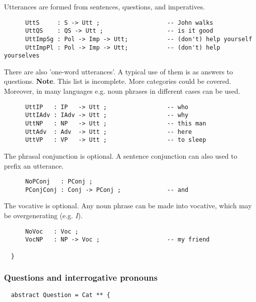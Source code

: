 \documentclass[11pt,a4paper]{article}
\newcommand{\commOut}[1]{}
\begin{document}
Utterances are formed from sentences, questions, and imperatives.

\begin{verbatim}
      UttS     : S -> Utt ;                   -- John walks
      UttQS    : QS -> Utt ;                  -- is it good
      UttImpSg : Pol -> Imp -> Utt;           -- (don't) help yourself
      UttImpPl : Pol -> Imp -> Utt;           -- (don't) help yourselves
\end{verbatim}

There are also 'one-word utterances'. A typical use of them is
as answers to questions.
\textbf{Note}. This list is incomplete. More categories could be covered.
Moreover, in many languages e.g. noun phrases in different cases
can be used.

\begin{verbatim}
      UttIP   : IP   -> Utt ;                 -- who
      UttIAdv : IAdv -> Utt ;                 -- why
      UttNP   : NP   -> Utt ;                 -- this man
      UttAdv  : Adv  -> Utt ;                 -- here
      UttVP   : VP   -> Utt ;                 -- to sleep
\end{verbatim}

The phrasal conjunction is optional. A sentence conjunction
can also used to prefix an utterance.

\begin{verbatim}
      NoPConj   : PConj ;                      
      PConjConj : Conj -> PConj ;             -- and
\end{verbatim}

The vocative is optional. Any noun phrase can be made into vocative,
which may be overgenerating (e.g. \textit{I}).

\begin{verbatim}
      NoVoc   : Voc ;
      VocNP   : NP -> Voc ;                   -- my friend
  
  }
\end{verbatim}

\commOut{Produced by 
gfdoc - a rudimentary GF document generator.
(c) Aarne Ranta (\htmladdnormallink{aarne@cs.chalmers.se}{mailto:aarne@cs.chalmers.se}) 2002 under GNU GPL.}


\subsubsection{Questions and interrogative pronouns}
\begin{verbatim}
  abstract Question = Cat ** {
\end{verbatim}
\end{document}
